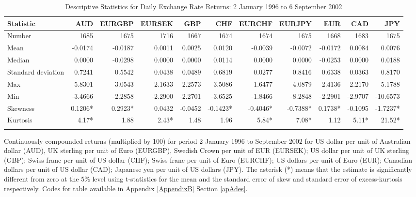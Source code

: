 \documentclass[12pt, a4paper, oneside]{article} %
\begin{document}
\begin{landscape}
\begin{table}[t]
\begin{threeparttable}
\caption{Descriptive Statistics for Daily Exchange Rate Returns: 2 January 1996 to 6 September 2002}
\begin{tabular}{l | r r  r r r r r r r r}
  \hline
 Statistic &  AUD & EURGBP & EURSEK & GBP & CHF & EURCHF & EURJPY & EUR & CAD & JPY \\
  \hline
Number & 1685 & 1675 & 1716 & 1667 & 1674 & 1674 & 1675 & 1668 & 1683 & 1675  \\
Mean & -0.0174 & -0.0187 & 0.0011 & 0.0025 & 0.0120 & -0.0039 & -0.0072 & -0.0172 & 0.0084 & 0.0076\\
Median &  0.0000 & -0.0298 & 0.0000& 0.0000 & 0.0114 & 0.0000 & 0.0000 & -0.0253 & 0.0000 & 0.0188\\
Standard deviation  & 0.7241 & 0.5542 & 0.0438 & 0.0489 & 0.6819 & 0.0277 & 0.8416 & 0.6338 & 0.0363 & 0.8170\\
Max & 5.8301 & 3.0543 & 2.1633 & 2.2573 & 3.5086 & 1.6477 & 4.0879 & 2.4136 & 2.2170 & 5.1788 \\
Min & -3.4666 & -2.2858 & -2.2900 & -2.2701 & -3.6525 & -1.8466 & -8.2848 & -2.2901 & -2.9707 & -10.6573 \\
Skewness  & 0.1206* & 0.2923* & 0.0432 & -0.0452 & -0.1423* & -0.4046* & -0.7388* & 0.1738* & -0.1095 & -1.7237*\\
Kurtosis & 4.17* & 1.88 & 2.43* & 1.48 & 1.96 & 5.84* & 7.08* & 1.12 & 5.11* & 21.52*\\
\hline
 \label{tabref:DS1}
\end{tabular}
\begin{tablenotes}
\small
\item Continuously compounded returns (multiplied by 100) for period 2 January 1996 to  September 2002 for US dollar per unit of Australian dollar (AUD), UK sterling per unit of Euro (EURGBP), Swedish Crown per unit of EUR (EURSEK); US dollar per unit of UK sterling (GBP);  Swiss franc per unit of US dollar (CHF); Swiss franc per unit of Euro (EURCHF); US dollars per unit of Euro (EUR); Canadian dollars per unit of US dollar (CAD); Japanese yen per unit of US dollars (JPY). The asterisk (*) means that the estimate is significantly different from zero at the 5\% level using t-statistics for the mean and the standard error of skew and standard error of excess-kurtosis respectively. Codes for table available in Appendix \ref{AppendixB} Section \ref{apAdes}.    
\end{tablenotes}
\end{threeparttable}
\end{table}
\end{landscape}
\end{document}
